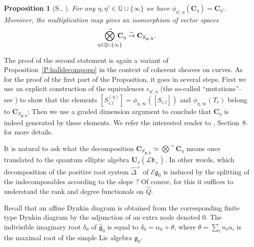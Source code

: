 \documentclass[a4paper,10pt]{amsart}
\def\Q{\mathbb{Q}}
\def\U{\mathbf{U}}
\def\a{\alpha}
\def\CC{\mathbf{C}}
\def\g{\mathfrak{g}}
\def\bo{\mathfrak{b}}
\def\xpl{\mathbb{X}_{\mathbf{p},\boldsymbol{\lambda}}}
\newtheorem{prop}[theo]{Proposition}
\numberwithin{equation}{section}
\begin{document}
{\vspace{.1in}

\begin{prop}[S., \cite{SDuke}] For any $\eta,\eta' \in \Q \cup \{\infty\}$ we have $\phi_{\eta',\eta}(\CC_{\eta})=\CC_{\eta'}$. Moreover, the multiplication map gives an isomorphism of vector spaces
$$\mathop{\vec{\bigotimes}}_{\eta \in \Q \cup \{\infty\}} \hspace{-.12in}\CC_{\eta} \stackrel{\sim}{\to} \CC_{\xpl}.$$
\end{prop}

\vspace{.05in}

The proof of the second statement is again a variant of Proposition~\ref{P:halldecompopo} in the context of coherent sheaves on curves. As for the proof of the first part of the Proposition, it goes in several steps. First we use an explicit construction of the equivalences $\epsilon_{\eta',\eta}$ (the so-called ``mutations''--see \cite{LM}) to show that the elements $[S_{i;l}^{(\eta)}]=\phi_{\eta,\infty}([S_{i;l}])$ and $\phi_{\eta,\infty}(T_r)$ belong to $\CC_{\xpl}$; Then we use a graded dimension argument to conclude that $\CC_{\eta}$ is indeed generated by these elements. We refer the interested reader to \cite{SDuke}, Section~8. for more details.

\vspace{.2in}

It is natural to ask what the decomposition $\CC_{\xpl} \simeq \vec{\bigotimes} \CC_{\eta}$ means once translated to the quantum elliptic algebra $\U_{\nu}(\mathcal{L}\bo_+)$. In other words, which decomposition of the positive root system $\widehat{\Delta}^+$ of $\mathcal{E}\g_0$ is induced by the splitting of the indecomposables according to the slope ? Of course, for this it suffices to understand the rank and degree functionals on $\widehat{Q}$.

Recall that an affine Dynkin diagram is obtained from the corresponding finite type Dynkin diagram by the adjunction of an extra node denoted $0$. The indivisible imaginary root $\delta_0$ of $\widehat{\g}_0$ is equal to $\delta_0=\a_0 + \theta$, where $\theta=\sum_i n_i\a_i$ is the maximal root of the simple Lie algebra $\g_0$.

\vspace{.1in}

}
\end{document}

